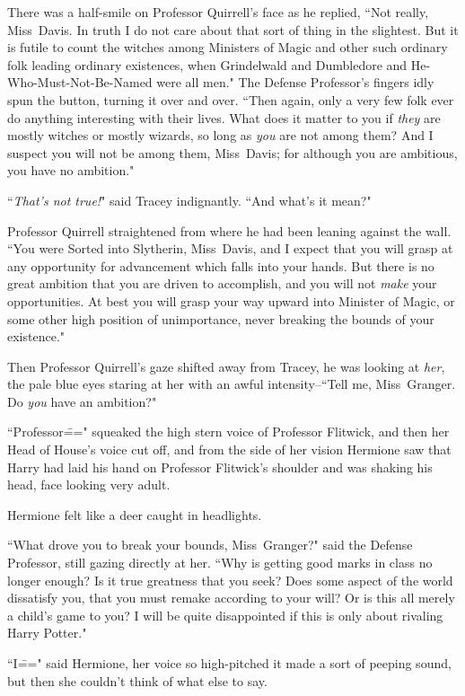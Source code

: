 There was a half-smile on Professor Quirrell's face as he replied, ``Not really, Miss~Davis. In truth I do not care about that sort of thing in the slightest. But it is futile to count the witches among Ministers of Magic and other such ordinary folk leading ordinary existences, when Grindelwald and Dumbledore and He-Who-Must-Not-Be-Named were all men." The Defense Professor's fingers idly spun the button, turning it over and over. ``Then again, only a very few folk ever do anything interesting with their lives. What does it matter to you if \emph{they} are mostly witches or mostly wizards, so long as \emph{you} are not among them? And I suspect you will not be among them, Miss~Davis; for although you are ambitious, you have no ambition."

``\emph{That's not true!}" said Tracey indignantly. ``And what's it mean?"

Professor Quirrell straightened from where he had been leaning against the wall. ``You were Sorted into Slytherin, Miss~Davis, and I expect that you will grasp at any opportunity for advancement which falls into your hands. But there is no great ambition that you are driven to accomplish, and you will not \emph{make} your opportunities. At best you will grasp your way upward into Minister of Magic, or some other high position of unimportance, never breaking the bounds of your existence."

Then Professor Quirrell's gaze shifted away from Tracey, he was looking at \emph{her}, the pale blue eyes staring at her with an awful intensity\---``Tell me, Miss~Granger. Do \emph{you} have an ambition?"

``Professor\===" squeaked the high stern voice of Professor Flitwick, and then her Head of House's voice cut off, and from the side of her vision Hermione saw that Harry had laid his hand on Professor Flitwick's shoulder and was shaking his head, face looking very adult.

Hermione felt like a deer caught in headlights.

``What drove you to break your bounds, Miss~Granger?" said the Defense Professor, still gazing directly at her. ``Why is getting good marks in class no longer enough? Is it true greatness that you seek? Does some aspect of the world dissatisfy you, that you must remake according to your will? Or is this all merely a child's game to you? I will be quite disappointed if this is only about rivaling Harry Potter."

``I\===" said Hermione, her voice so high-pitched it made a sort of peeping sound, but then she couldn't think of what else to say.

